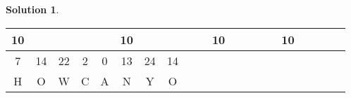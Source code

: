 \documentclass[11pt]{article}
\theoremstyle{definition}\newtheorem{definition}{Definition}
\theoremstyle{definition}\newtheorem{question}{Question}
\theoremstyle{definition}\newtheorem*{solution}{Solution}
\begin{document}
\begin{solution}
\begin{center}
\begin{tabular}{|cccccccccccccccccccc|}
            10    &       &       &                            & \multicolumn{1}{c|}{}      & 10    &       &                            &       & \multicolumn{1}{c|}{}      & 10    &                            &       &       & \multicolumn{1}{c|}{}      & 10                         &       &       &       &       \\ \hline
            7     & 14    & 22    & 2                          & \multicolumn{1}{c|}{0}     & 13    & 24    & \multicolumn{1}{c|}{14}    &       &                            &       &                            &       &       &                            &                            &       &       &       &       \\ \cline{1-8}
            H     & O     & W     & C                          & \multicolumn{1}{c|}{A}     & N     & Y     & \multicolumn{1}{c|}{O}     &       &                            &       &                            &       &       &                            &                            &       &       &       &       \\ \hline
            \end{tabular}
        \end{center}
    

\end{solution}
\end{document}
